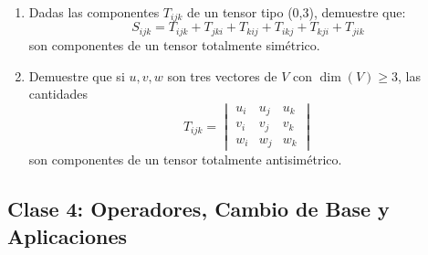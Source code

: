 \documentclass[12pt,a4paper]{article}
\begin{document}
\begin{enumerate}[1.]
\item Dadas las componentes $T_{ijk}$ de un tensor tipo (0,3), demuestre que:
\[
S_{ijk}=T_{ijk}+T_{jki}+T_{kij}+T_{ikj}+T_{kji}+T_{jik}
\]
son componentes de un tensor totalmente simétrico.

\item Demuestre que si $u,v,w$ son tres vectores de $V$ con $\dim(V)\geq3$, las cantidades
\[
T_{ijk}=\begin{vmatrix}
u_i & u_j & u_k \\
v_i & v_j & v_k \\
w_i & w_j & w_k
\end{vmatrix}
\]
son componentes de un tensor totalmente antisimétrico.
\end{enumerate}

\subsection*{Clase 4: Operadores, Cambio de Base y Aplicaciones}
\end{document}
